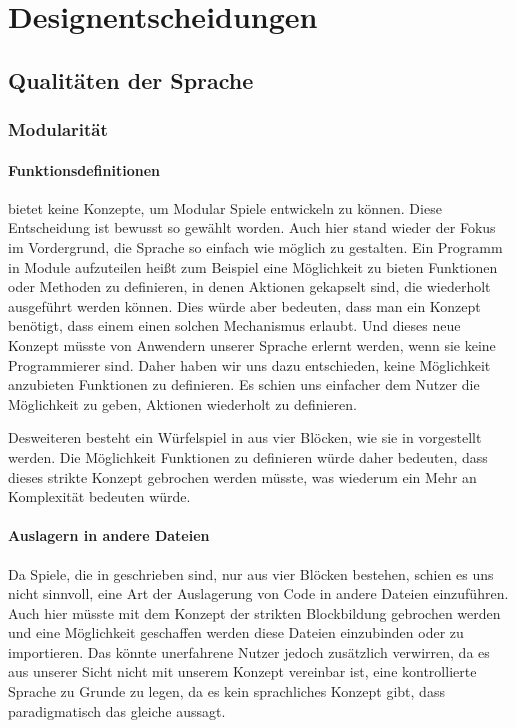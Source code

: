 
\chapter{Designentscheidungen}
\label{cha:designentscheidungen}

\section{Qualitäten der Sprache} %
\label{sec:qualitaten_der_sprache}


\subsection{Modularität} %
\label{sub:modularitat}
\subsubsection{Funktionsdefinitionen}
\label{subsub:funktionsdefinitionen}
	\dg bietet keine Konzepte, um Modular Spiele entwickeln zu können. Diese Entscheidung ist bewusst so gewählt worden. Auch hier stand wieder der Fokus im Vordergrund, die Sprache so einfach wie möglich zu gestalten. Ein Programm in Module aufzuteilen heißt zum Beispiel eine Möglichkeit zu bieten Funktionen oder Methoden zu definieren, in denen Aktionen gekapselt sind, die wiederholt ausgeführt werden können. Dies würde aber bedeuten, dass man ein Konzept benötigt, dass einem einen solchen Mechanismus erlaubt. Und dieses neue Konzept müsste von Anwendern unserer Sprache erlernt werden, wenn sie keine Programmierer sind. Daher haben wir uns dazu entschieden, keine Möglichkeit anzubieten Funktionen zu definieren. Es schien uns einfacher dem Nutzer die Möglichkeit zu geben, Aktionen wiederholt zu definieren.

	Desweiteren besteht ein Würfelspiel in \dg aus vier Blöcken, wie sie in  vorgestellt werden. Die Möglichkeit Funktionen zu definieren würde daher bedeuten, dass dieses strikte Konzept gebrochen werden müsste, was wiederum ein Mehr an Komplexität bedeuten würde.
\subsubsection{Auslagern in andere Dateien}
\label{subsub:auslagern_in_andere_dateien}
	Da Spiele, die in \dg geschrieben sind, nur aus vier Blöcken bestehen, schien es uns nicht sinnvoll, eine Art der Auslagerung von Code in andere Dateien einzuführen. Auch hier müsste mit dem Konzept der strikten Blockbildung gebrochen werden und eine Möglichkeit geschaffen werden diese Dateien einzubinden oder zu importieren. Das könnte unerfahrene Nutzer jedoch zusätzlich verwirren, da es aus unserer Sicht nicht mit unserem Konzept vereinbar ist, \dg eine kontrollierte Sprache zu Grunde zu legen, da es kein sprachliches Konzept gibt, dass paradigmatisch das gleiche aussagt.

